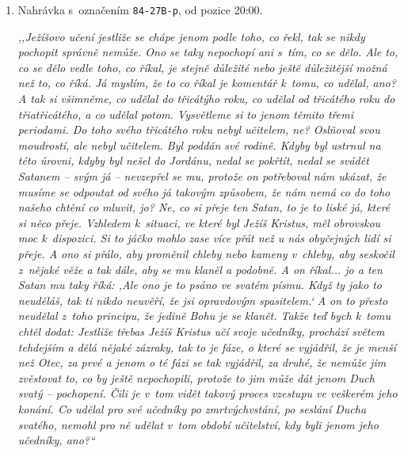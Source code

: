 
\begin{enumerate}

\item{
Nahrávka s~označením \texttt{84-27B-p}, od pozice 20:00.

\textit{%
,,Ježíšovo učení jestliže se chápe jenom podle toho, co řekl, tak se nikdy
pochopit správně nemůže. Ono se taky nepochopí ani s~tím, co se dělo.
Ale to, co se dělo vedle toho, co říkal, je stejně důležité nebo ještě důležitější
možná než to, co říká. Já myslím, že to co říkal je komentář k~tomu, co udělal,
ano? A
tak si všimněme, co udělal do třicátýho roku, co udělal od třicátého roku do
třiatřicátého, a co udělal potom. Vysvětleme si to jenom těmito třemi
periodami. Do toho svého třicátého roku nebyl učitelem, ne? Oslňoval svou
moudrostí,
ale nebyl učitelem. Byl poddán své rodině. Kdyby byl ustrnul na této úrovni, kdyby byl
nešel do Jordánu, nedal se pokřtít, nedal se svádět Satanem -- svým já -- nevzepřel
se mu, protože on potřeboval nám ukázat, že musíme se odpoutat od svého já takovým
způsobem, že nám nemá co do toho našeho chtění co mluvit, jo? Ne, co si přeje
ten Satan, to je to liské já, které si něco přeje. Vzhledem k~situaci, ve které byl
Ježíš Kristus, měl obrovskou moc k~dispozici. Si to jáčko mohlo zase více přát
než u nás obyčejných lidí si přeje. A ono si přálo, aby proměnil chleby nebo kameny
v~chleby, aby seskočil z~nějaké věže a tak dále, aby se mu klaněl a podobně. A on
říkal... jo a ten Satan mu taky říká: ,Ale ono je to psáno ve svatém písmu. Když ty
jako to neuděláš, tak ti nikdo neuvěří, že jsi opravdovým spasitelem.` A on to přesto
neudělal z~toho principu, že jedině Bohu je se klanět. Takže teď bych k~tomu chtěl
dodat: Jestliže třebas Ježíš Kristus učí svoje učedníky, prochází světem tehdejším
a dělá nějaké zázraky, tak to je fáze, o které se vyjádřil, že je menší než
Otec, za
prvé a jenom o té fázi se tak vyjádřil, za druhé, že nemůže jim zvěstovat to,
co by ještě nepochopili, protože to jim může dát jenom Duch svatý -- pochopení. Čili
je v~tom vidět takový proces vzestupu ve veškerém jeho konání. Co udělal pro své
učedníky po zmrtvýchvstání, po seslání Ducha svatého, nemohl pro ně udělat v~tom
období učitelství, kdy byli jenom jeho učedníky, ano?{}``
}

}
\end{enumerate}
